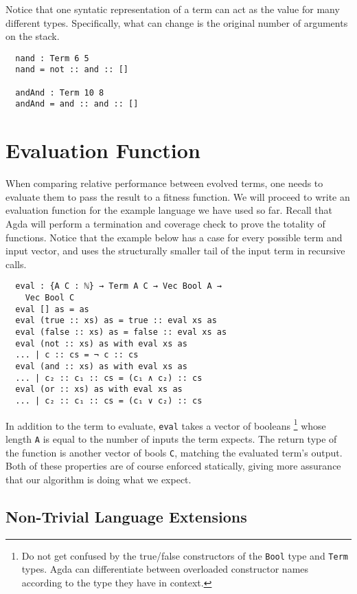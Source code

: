 \documentclass{acm_proc_article-sp}
\begin{document}
Notice that one syntatic representation of a term can act as the value
for many different types. Specifically, what can change is the
original number of arguments on the stack.

\begin{verbatim}
  nand : Term 6 5
  nand = not :: and :: []

  andAnd : Term 10 8
  andAnd = and :: and :: []
\end{verbatim}

\section{Evaluation Function}

When comparing relative performance between evolved terms, one needs
to evaluate them to pass the result to a fitness function. We will
proceed to write an evaluation function for the example language we
have used so far. Recall that Agda will perform a termination and
coverage check to prove the totality of functions. Notice that the
example below has a case for every possible term and input vector, and
uses the structurally smaller tail of the input term in recursive
calls.

\begin{verbatim}
  eval : {A C : ℕ} → Term A C → Vec Bool A →
    Vec Bool C
  eval [] as = as
  eval (true :: xs) as = true :: eval xs as
  eval (false :: xs) as = false :: eval xs as
  eval (not :: xs) as with eval xs as
  ... | c :: cs = ¬ c :: cs
  eval (and :: xs) as with eval xs as
  ... | c₂ :: c₁ :: cs = (c₁ ∧ c₂) :: cs
  eval (or :: xs) as with eval xs as
  ... | c₂ :: c₁ :: cs = (c₁ ∨ c₂) :: cs
\end{verbatim}

In addition to the term to evaluate, \texttt{eval} takes a vector of
booleans \footnote{Do not get confused by the true/false constructors
  of the \texttt{Bool} type and \texttt{Term} types. Agda can
  differentiate between overloaded constructor names according to the
  type they have in context.}
whose length \texttt{A} is equal to the number of inputs the
term expects. The return type of the function is another vector of
bools \texttt{C}, matching the evaluated term's output. Both of these
properties are of course enforced statically, giving more assurance that
our algorithm is doing what we expect.

\subsection{Non-Trivial Language Extensions}
\end{document}

